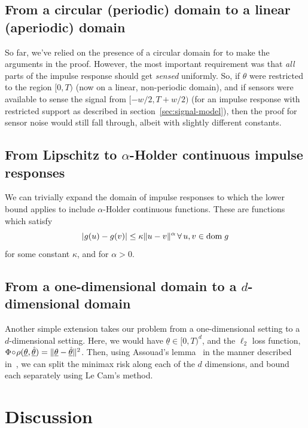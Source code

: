 \documentclass[conference]{IEEEtran}
\providecommand{\v}{}
\renewcommand{\v}[1]{\underline{#1}}
\providecommand{\vhat}{}
\renewcommand{\vhat}[1]{\underline{\hat{#1}}}
\DeclarePairedDelimiter\abs{\lvert}{\rvert}
\DeclarePairedDelimiter\norm{\lVert}{\rVert}
\newcommand{\Phiorho}{\Phi\!\circ\!\rho}
\begin{document}
\subsection{From a circular (periodic) domain to a linear (aperiodic) domain}

So far, we've relied on the presence of a circular domain for to make the
arguments in the proof. However, the most important requirement was that
\emph{all} parts of the impulse response should get \emph{sensed} uniformly.
So, if $\theta$ were restricted to the region $[0, T)$ (now on a linear,
non-periodic domain), and if sensors were available to sense the signal from
$[-w/2, T{+}w/2)$ (for an impulse response with restricted support as described
in section~\ref{sec:signal-model}), then the proof for sensor noise would still
fall through, albeit with slightly different constants.

\subsection{From Lipschitz to $\alpha$-Holder continuous impulse responses}

We can trivially expand the domain of impulse responses to which the lower
bound applies to include $\alpha$-Holder continuous functions. These are
functions which satisfy
\begin{equation}
	\abs{g(u) - g(v)} \leq \kappa \norm{u - v}^\alpha \, \forall \, u, v \in \text{dom} \; g
\end{equation}
for some constant $\kappa$, and for $\alpha > 0$.

\subsection{From a one-dimensional domain to a $d$-dimensional domain}

Another simple extension takes our problem from a one-dimensional setting to a
$d$-dimensional setting. Here, we would have $\v\theta \in [0, T)^d$, and the
$\ell_2$ loss function, $\Phiorho(\v\theta, \vhat\theta) = \norm{\v\theta -
\vhat\theta}^2$. Then, using Assouad's lemma~\cite{Tsybakov} in the manner
described in~\cite{Duchi2015Information}, we can split the minimax risk
along each of the $d$ dimensions, and bound each separately using Le Cam's
method.

\section{Discussion}
\label{sec:discussion}
\end{document}
